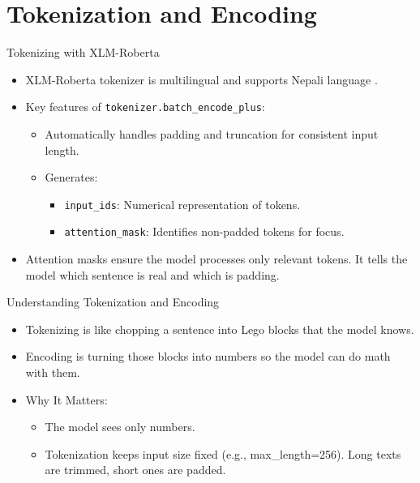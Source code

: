 \documentclass[aspectratio=169]{beamer}
\begin{document}
\section{Tokenization and Encoding}
\begin{frame}{Tokenizing with XLM-Roberta}
  \begin{itemize}
    \item XLM-Roberta tokenizer is multilingual and supports Nepali language \parencite{conneau-etal-2020-unsupervised}.
    \item Key features of \texttt{tokenizer.batch\_encode\_plus}:
          \begin{itemize}
            \item Automatically handles padding and truncation for consistent input length.
            \item Generates:
                  \begin{itemize}
                    \item \texttt{input\_ids}: Numerical representation of tokens.
                    \item \texttt{attention\_mask}: Identifies non-padded tokens for focus.
                  \end{itemize}
          \end{itemize}
    \item Attention masks ensure the model processes only relevant tokens. It tells the model which sentence is real and which is padding.
  \end{itemize}
\end{frame}
\begin{frame}{Understanding Tokenization and Encoding}
  \begin{itemize}
    \item Tokenizing is like chopping a sentence into Lego blocks that the model knows.
    \item Encoding is turning those blocks into numbers so the model can do math with them.
    \item Why It Matters:
          \begin{itemize}
            \item The model sees only numbers.
            \item Tokenization keeps input size fixed (e.g., max\_length=256). Long texts are trimmed, short ones are padded.
          \end{itemize}
  \end{itemize}
\end{frame}
\end{document}
